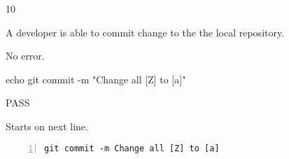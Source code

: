 \begin{description}[align=right,leftmargin=3.2cm,labelindent=3.0cm]
\item[Step:] 10
\item[Confirm:] A developer is able to commit change to the the local repository.
\item[Expectation:] No error.
\item[Command:] echo git  commit -m "Change all [Z] to [a]"
\item[Test Result:] PASS
\item[Evidence:] Starts on next line.
\end{description}
\begin{lstlisting}[numbers=left]
git commit -m Change all [Z] to [a]

\end{lstlisting}
